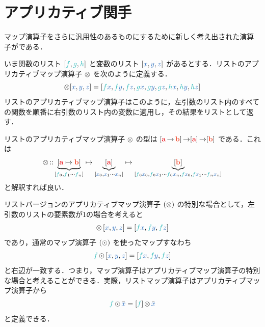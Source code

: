 \documentclass[a5paper,twoside,fleqn,draft]{jsbook}
\begin{document}
\section{アプリカティブ関手}

マップ演算子をさらに汎用性のあるものにするために新しく考え出された演算子がである．

いま関数のリスト $[\hFunc{f},\hFunc{g},\mHFunc]$ と変数のリスト $[\hVar{x},\hVar{y},\hVar{z}]$ があるとする．リストのアプリカティブマップ演算子 $\operatorname{\otimes}$ を次のように定義する．
\begin{equation}
  [\hFunc{f},\hFunc{g},\mHFunc]\mAppMapList[\hVar{x},\hVar{y},\hVar{z}]
  =[\hFunc{f}\hVar{x},\hFunc{f}\hVar{y},\hFunc{f}\hVar{z},\hFunc{g}\hVar{x},\hFunc{g}\hVar{y},\hFunc{g}\hVar{z},\mHFunc\hVar{x},\mHFunc\hVar{y},\mHFunc\hVar{z}]
\end{equation}
リストのアプリカティブマップ演算子はこのように，左引数のリスト内のすべての関数を順番に右引数のリスト内の変数に適用し，その結果をリストとして返す．

リストのアプリカティブマップ演算子 $\operatorname{\otimes}$ の型は
$[\hTypeName{a}\hFunctionArrow\mB]\hFunctionArrow\hListConstruct{\hTypeName{a}}\hFunctionArrow[\mB]$ である．これは
\begin{equation}
  \mAppMapList
  \hIsTypeOf\underbrace{[\hTypeName{a}\mapsto\mB]}_{[\hFunc{f}_0,\hFunc{f}_1\dotsb \hFunc{f}_n]}
  \mapsto\underbrace{\hListConstruct{\hTypeName{a}}}_{[\hVar{x}_0,\hVar{x}_1\dotsb \hVar{x}_n]}
  \mapsto\underbrace{[\mB]}_{[\hFunc{f}_0\hVar{x}_0,\hFunc{f}_0\hVar{x}_1\dotsb \hFunc{f}_0\hVar{x}_n,\hFunc{f} \hVar{x}_0,\hFunc{f} \hVar{x}_1\dotsb \hFunc{f}_n\hVar{x}_n]}
\end{equation}
と解釈すれば良い．

リストバージョンのアプリカティブマップ演算子 $(\operatorname{\otimes})$ の特別な場合として，左引数のリストの要素数が1の場合を考えると
\begin{equation}
  [\hFunc{f}]\mAppMapList{}[\hVar{x},\hVar{y},\hVar{z}]
  =[\hFunc{f}\hVar{x},\hFunc{f}\hVar{y},\hFunc{f}\hVar{z}]
\end{equation}
であり，通常のマップ演算子 $(\operatorname{\odot})$ を使ったマップすなわち
\begin{equation}
  \hFunc{f}\mMapList{}[\hVar{x},\hVar{y},\hVar{z}]
  =[\hFunc{f}\hVar{x},\hFunc{f}\hVar{y},\hFunc{f}\hVar{z}]
\end{equation}
と右辺が一致する．つまり，マップ演算子はアプリカティブマップ演算子の特別な場合と考えることができる．実際，リストマップ演算子はアプリカティブマップ演算子から
\begin{equation}
  \hFunc{f}\mMapList\hListVarWith{x}
  =[\hFunc{f}]\mAppMapList\hListVarWith{x}
\end{equation}
と定義できる．
\end{document}
